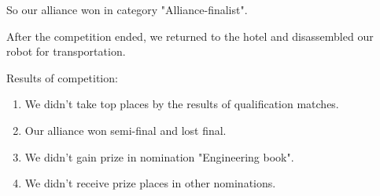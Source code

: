 So our alliance won in category "Alliance-finalist".\newline

After the competition ended, we returned to the hotel and disassembled our robot for transportation.

Results of competition:
\begin{enumerate}
	\item We didn't take top places by the results of qualification matches.
	
	\item Our alliance won semi-final and lost final.
	
	\item We didn't gain prize in nomination "Engineering book".
	
	\item We didn't receive prize places in other nominations.
\end{enumerate}

